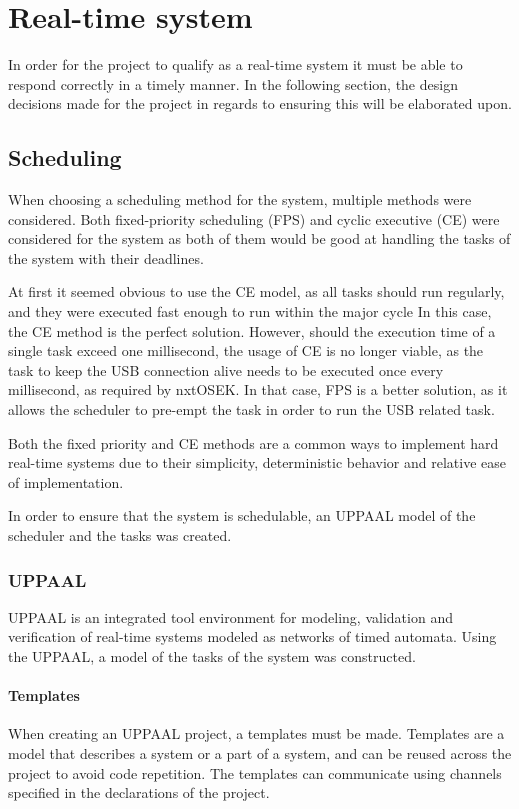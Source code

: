 \section{Real-time system}\label{Design:RTS}
In order for the project to qualify as a real-time system it must be able to respond correctly in a timely manner.
In the following section, the design decisions made for the project in regards to ensuring this will be elaborated upon.

\subsection{Scheduling}\label{Design:Scheduling}
When choosing a scheduling method for the system, multiple methods were considered.
Both fixed-priority scheduling (FPS) and cyclic executive (CE) were considered for the system as both of them would be good at handling the tasks of the system with their deadlines.

At first it seemed obvious to use the CE model, as all tasks should run regularly, and they were executed fast enough to run within the major cycle
In this case, the CE method is the perfect solution.
However, should the execution time of a single task exceed one millisecond, the usage of CE is no longer viable, as the task to keep the USB connection alive needs to be executed once every millisecond, as required by nxtOSEK.
In that case, FPS is a better solution, as it allows the scheduler to pre-empt the task in order to run the USB related task.

Both the fixed priority and CE methods are a common ways to implement hard real-time systems due to their simplicity, deterministic behavior and relative ease of implementation\cite{CyclicExecutionKimLarsen}.

In order to ensure that the system is schedulable, an UPPAAL model of the scheduler and the tasks was created.

\subsubsection{UPPAAL}
UPPAAL is an integrated tool environment for modeling, validation and verification of real-time systems modeled as networks of timed automata\cite{UPPAALWebsite}.
Using the UPPAAL, a model of the tasks of the system was constructed.

\paragraph{Templates}
When creating an UPPAAL project, a templates must be made.
Templates are a model that describes a system or a part of a system, and can be reused across the project to avoid code repetition.
The templates can communicate using channels specified in the declarations of the project.

